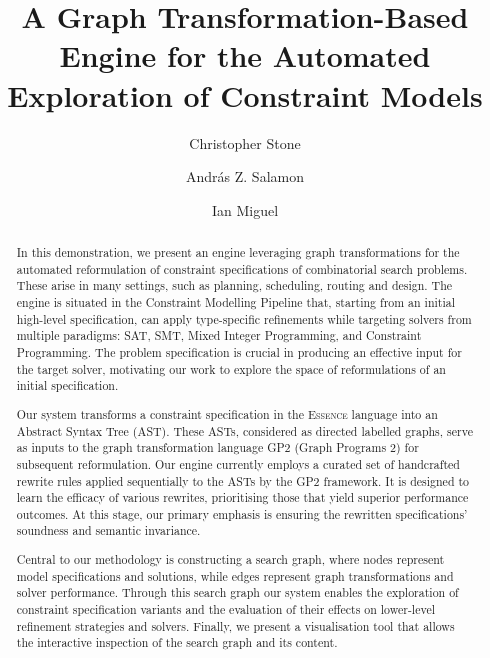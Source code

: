 \documentclass[runningheads]{llncs}
\begin{document}
\title{A Graph Transformation-Based Engine for the Automated Exploration of Constraint Models}

\author{Christopher Stone 
\and
András Z. Salamon 
\and
Ian Miguel }
%




\newcommand{\essence}{\textsc{Essence}\xspace}
\newcommand{\conjure}{\textsc{Conjure}\xspace}
\newcommand{\savilerow}{\textsc{Savile Row}\xspace}
\newcommand{\code}[1]{{\texttt{#1}}}

\maketitle

\begin{abstract}
In this demonstration, we present an engine leveraging graph transformations for the automated reformulation of constraint specifications of combinatorial search problems. These arise in many settings, such as planning, scheduling, routing and design. The engine is situated in the Constraint Modelling Pipeline that, starting from an initial high-level specification, can apply type-specific refinements while targeting solvers from multiple paradigms: SAT, SMT, Mixed Integer Programming, and Constraint Programming. The problem specification is crucial in producing an effective input for the target solver, motivating our work to explore the space of reformulations of an initial specification.

Our system transforms a constraint specification in the \essence language into an Abstract Syntax Tree (AST). These ASTs, considered as directed labelled graphs, serve as inputs to the graph transformation language GP2 (Graph Programs 2) for subsequent reformulation. Our engine currently employs a curated set of handcrafted rewrite rules applied sequentially to the ASTs by the GP2 framework. It is designed to learn the efficacy of various rewrites, prioritising those that yield superior performance outcomes. At this stage, our primary emphasis is ensuring the rewritten specifications' soundness and semantic invariance.

Central to our methodology is constructing a search graph, where nodes represent model specifications and solutions, while edges represent graph transformations and solver performance. Through this search graph our system enables the exploration of constraint specification variants and the evaluation of their effects on lower-level refinement strategies and solvers.
Finally, we present a visualisation tool that allows the interactive inspection of the search graph and its content.
\end{abstract}
\end{document}
